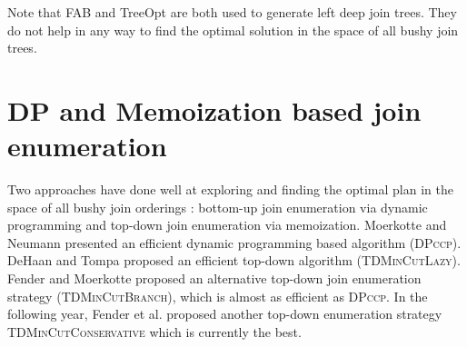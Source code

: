 Note that FAB and TreeOpt are both used to generate left deep join trees. They do not help in any way to find the optimal solution in the space of all bushy join trees. 

\section{DP and Memoization based join enumeration}
Two approaches have done well at exploring and finding the optimal plan in the space of all bushy join orderings : bottom-up join enumeration via dynamic programming and top-down join enumeration via memoization. Moerkotte and Neumann \cite{moerkotte2006analysis} presented an efficient dynamic programming based algorithm (\textsc{DPccp}). DeHaan and Tompa \cite{dehaan2007optimal} proposed an efficient top-down algorithm (\textsc{TDMinCutLazy}). Fender and Moerkotte \cite{fender2011new} proposed an alternative top-down join enumeration strategy (\textsc{TDMinCutBranch}), which is almost as efficient as \textsc{DPccp}. In the following year, Fender et al.\cite{fender2012effective} proposed another top-down enumeration strategy \textsc{TDMinCutConservative} which is currently the best.

